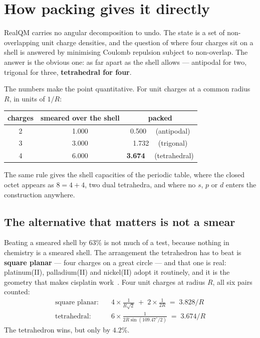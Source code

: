 \documentclass[11pt]{article}
\begin{document}
\section{How packing gives it directly}

RealQM carries no angular decomposition to undo. The state is a set of non-overlapping unit charge
densities, and the question of where four charges sit on a shell is answered by minimising Coulomb
repulsion subject to non-overlap. The answer is the obvious one: as far apart as the shell allows
--- antipodal for two, trigonal for three, \textbf{tetrahedral for four}.

The numbers make the point quantitative. For unit charges at a common radius $R$, in units of
$1/R$:

\begin{center}
\begin{tabular}{ccc}
\toprule
charges & smeared over the shell & packed \\
\midrule
2 & 1.000 & 0.500 \ \ (antipodal) \\
3 & 3.000 & 1.732 \ \ (trigonal) \\
4 & 6.000 & \textbf{3.674} \ \ (tetrahedral) \\
\bottomrule
\end{tabular}
\end{center}

The same rule gives the shell capacities of the periodic table, where the closed octet appears as
$8 = 4{+}4$, two dual tetrahedra, and where no $s$, $p$ or $d$ enters the construction anywhere.

\subsection*{The alternative that matters is not a smear}

Beating a smeared shell by $63\%$ is not much of a test, because nothing in chemistry is a smeared
shell. The arrangement the tetrahedron has to beat is \textbf{square planar} --- four charges on a
great circle --- and that one is real: platinum(II), palladium(II) and nickel(II) adopt it
routinely, and it is the geometry that makes cisplatin work~\cite{Rosenberg1969}. Four unit charges at radius $R$, all
six pairs counted:
\begin{align*}
\text{square planar:}&\quad 4\times\tfrac{1}{R\sqrt2} \;+\; 2\times\tfrac{1}{2R}
   \;=\; 3.828/R \\[2pt]
\text{tetrahedral:}&\quad 6\times\tfrac{1}{2R\sin(109.47^\circ/2)}
   \;=\; \mathbf{3.674}/R
\end{align*}
The tetrahedron wins, but only by $\mathbf{4.2\%}$.
\end{document}
